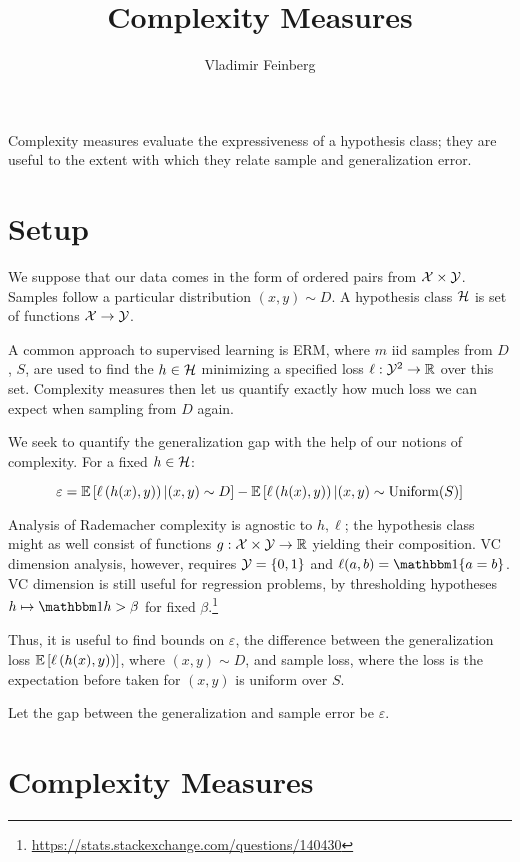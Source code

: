 \documentclass{article}
\title{Complexity Measures}
\author{Vladimir Feinberg}
\begin{document}
\maketitle

Complexity measures evaluate the expressiveness of a hypothesis class; they are useful to the extent with which they relate sample and generalization error.

\section{Setup}

We suppose that our data comes in the form of ordered pairs from $\mathcal{X}\times \mathcal{Y}$. Samples follow a particular distribution $(x, y)\sim D$. A hypothesis class $\mathcal{H}$ is set of functions $\mathcal{X}\rightarrow\mathcal{Y}$.

A common approach to supervised learning is ERM, where $m$ iid samples from $D$, $S$, are used to find the $h\in\mathcal{H}$ minimizing a specified loss $\ell:\mathcal{Y}^2\rightarrow\mathbb{R}$ over this set. Complexity measures then let us quantify exactly how much loss we can expect when sampling from $D$ again.

We seek to quantify the generalization gap with the help of our notions of complexity. For a fixed $h\in \mathcal{H}$:

$$
\varepsilon= \operatorname{\mathbb{E}}\left[\ell\left({h(x), y)}\right)|(x,y)\sim D\right]-\operatorname{\mathbb{E}}\left[\ell\left({h(x), y)}\right)|(x,y)\sim \operatorname{Uniform}(S)\right]
$$

Analysis of Rademacher complexity is agnostic to $h,\ell$; the hypothesis class might as well consist of functions $g:\mathcal{X}\times\mathcal{Y}\rightarrow\mathbb{R}$ yielding their composition. VC dimension analysis, however, requires $\mathcal{Y}=\{0, 1\}$ and $\ell(a, b)=\indicator\{a=b\}$. VC dimension is still useful for regression problems, by thresholding hypotheses $h\mapsto \indicator{h>\beta}$ for fixed $\beta$.\footnote{\url{https://stats.stackexchange.com/questions/140430}}


Thus, it is useful to find bounds on $\varepsilon$, the difference between the generalization loss $\operatorname{\mathbb{E}}\left[\ell\left({h(x), y)}\right)\right]$, where $(x,y)\sim D$, and sample loss, where the loss is the expectation before taken for $(x,y)$ is uniform over $S$.

Let the gap between the generalization and sample error be $\varepsilon$.

\section{Complexity Measures}
\end{document}

